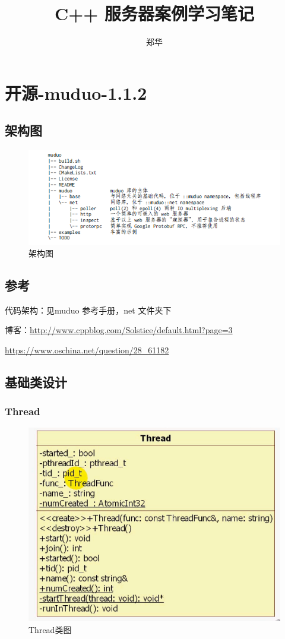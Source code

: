 \documentclass[UTF8,a4paper,8pt]{ctexbook}
\author{郑华}
\title{C++  服务器案例学习笔记}
\begin{document}
 	\maketitle
 	\tableofcontents
\chapter{开源-muduo-1.1.2}	
	 \section{架构图}
		 \begin{figure}[h]
		 	\centering
		 	\includegraphics[scale = 0.7]{muduo.png}
		 	\caption{架构图}
		 \end{figure}
 
	 \section{参考}
		 代码架构：见muduo 参考手册，net 文件夹下
		 
		 博客：\url{http://www.cppblog.com/Solstice/default.html?page=3}
		 
			 \url{https://www.oschina.net/question/28_61182}
			 
	\section{基础类设计}
		\subsection{Thread}
			\begin{figure}[ht]
				\centering
				\includegraphics[scale= 0.3]{figure/muduoThread.png}
				\caption{Thread类图}
			\end{figure}
			
\end{document}
